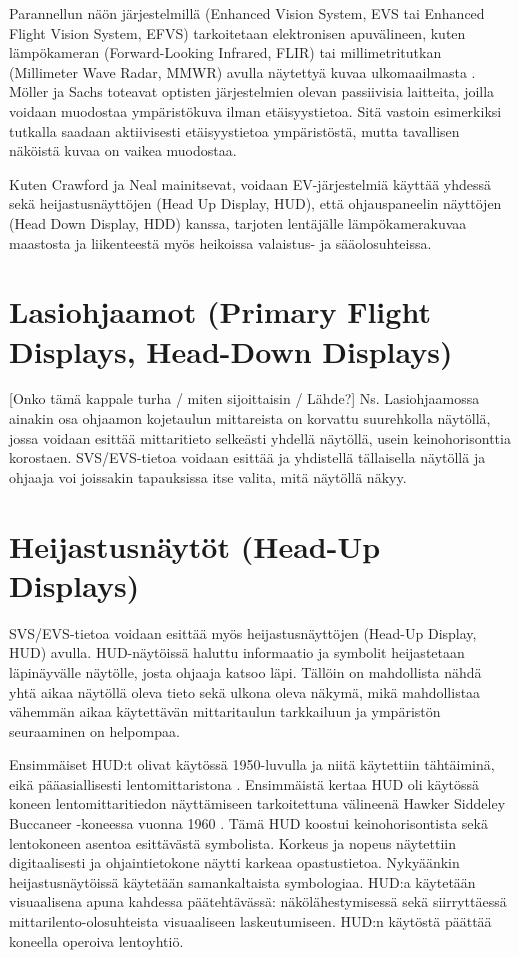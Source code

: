 \documentclass[utf8,bachelor,manualbib]{gradu3}
\begin{document}
Parannellun näön järjestelmillä (Enhanced Vision System, EVS tai Enhanced Flight Vision System, EFVS) tarkoitetaan elektronisen apuvälineen, kuten lämpökameran (Forward-Looking Infrared, FLIR) tai millimetritutkan (Millimeter Wave Radar, MMWR) avulla näytettyä kuvaa ulkomaailmasta \citep{baileyym2007}. Möller ja Sachs \citeyearpar{mollersachs1994} toteavat optisten järjestelmien olevan passiivisia laitteita, joilla voidaan muodostaa ympäristökuva ilman etäisyystietoa. Sitä vastoin esimerkiksi tutkalla saadaan aktiivisesti etäisyystietoa ympäristöstä, mutta tavallisen näköistä kuvaa on vaikea muodostaa.

Kuten Crawford ja Neal \citeyearpar{crawfordneal2006} mainitsevat, voidaan EV-järjestelmiä käyttää yhdessä sekä heijastusnäyttöjen (Head Up Display, HUD), että ohjauspaneelin näyttöjen (Head Down Display, HDD) kanssa, tarjoten lentäjälle lämpökamerakuvaa maastosta ja liikenteestä myös heikoissa valaistus- ja sääolosuhteissa.

\section{Lasiohjaamot (Primary Flight Displays, Head-Down Displays)}

[Onko tämä kappale turha / miten sijoittaisin / Lähde?] Ns. Lasiohjaamossa ainakin osa ohjaamon kojetaulun mittareista on korvattu suurehkolla näytöllä, jossa voidaan esittää mittaritieto selkeästi yhdellä näytöllä, usein keinohorisonttia korostaen. SVS/EVS-tietoa voidaan esittää ja yhdistellä tällaisella näytöllä ja ohjaaja voi joissakin tapauksissa itse valita, mitä näytöllä näkyy.

\section{Heijastusnäytöt (Head-Up Displays)}

SVS/EVS-tietoa voidaan esittää myös heijastusnäyttöjen (Head-Up Display, HUD) avulla. HUD-näytöissä haluttu informaatio ja symbolit heijastetaan läpinäyvälle näytölle, josta ohjaaja katsoo läpi. Tällöin on mahdollista nähdä yhtä aikaa näytöllä oleva tieto sekä ulkona oleva näkymä, mikä mahdollistaa vähemmän aikaa käytettävän mittaritaulun tarkkailuun ja ympäristön seuraaminen on helpompaa. \citep{crawfordneal2006}

Ensimmäiset HUD:t olivat käytössä 1950-luvulla ja niitä käytettiin tähtäiminä, eikä pääasiallisesti lentomittaristona \citep{crawfordneal2006}. Ensimmäistä kertaa HUD oli käytössä koneen lentomittaritiedon näyttämiseen tarkoitettuna välineenä Hawker Siddeley Buccaneer -koneessa vuonna 1960 \citep{weintraubensing1992}. Tämä HUD koostui keinohorisontista sekä lentokoneen asentoa esittävästä symbolista. Korkeus ja nopeus näytettiin digitaalisesti ja ohjaintietokone näytti karkeaa opastustietoa. Nykyäänkin heijastusnäytöissä käytetään samankaltaista symbologiaa. HUD:a käytetään visuaalisena apuna kahdessa päätehtävässä: näkölähestymisessä sekä siirryttäessä mittarilento-olosuhteista visuaaliseen laskeutumiseen. HUD:n käytöstä päättää koneella operoiva lentoyhtiö. \citep{crawfordneal2006}
\end{document}
